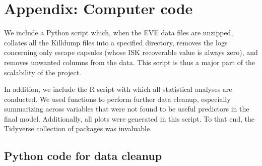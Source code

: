 \documentclass[letterpaper,12pt,article]{memoir}
\begin{document}
\backmatter
\newpage



\newpage
\chapter[Appendix: Computer code]{Appendix: Computer code}
We include a Python script which, when the EVE data files are unzipped, collates
all the Killdump files into a specified directory, removes the logs concerning
only escape capsules (whose ISK recoverable value is always zero), and removes
unwanted columns from the data. This script is thus a major part of the
scalability of the project. \medskip

In addition, we include the R script with which all statistical analyses are
conducted. We used functions to perform further data cleanup, especially
summarizing across variables that were not found to be useful predictors in the
final model. Additionally, all plots were generated in this script. To that end,
the Tidyverse collection of packages was invaluable. \medskip

\section{Python code for data cleanup}
\end{document}
